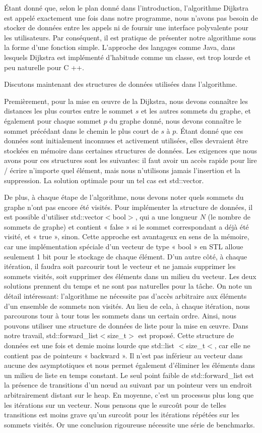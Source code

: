\documentclass[12pt]{article}
\begin{document}
	Étant donné que, selon le plan donné dans l'introduction, l'algorithme Dijkstra est appelé exactement une fois dans notre programme, nous n'avons pas besoin de stocker de données entre les appels ni de fournir une interface polyvalente pour les utilisateurs. Par conséquent, il est pratique de présenter notre algorithme sous la forme d'une fonction simple. L'approche des langages comme Java, dans lesquels Dijkstra est implémenté d’habitude comme un classe, est trop lourde et peu naturelle pour C ++.
	
	Discutons maintenant des structures de données utilisées dans l'algorithme.
	
	Premièrement, pour la mise en œuvre de la Dijkstra, nous devons connaître les distances les plus courtes entre le sommet $s$ et les autres sommets du graphe, et également pour chaque sommet $p$ du graphe donné, nous devons connaître le sommet précédant dans le chemin le plus court de $s$ à $p$. Étant donné que ces données sont initialement inconnues et activement utilisées, elles devraient être stockées en mémoire dans certaines structures de données. Les exigences que nous avons pour ces structures sont les suivantes: il faut avoir un accès rapide pour lire / écrire n'importe quel élément, mais nous n'utilisons jamais l'insertion et la suppression. La solution optimale pour un tel cas est std::vector.
	
	De plus, à chaque étape de l'algorithme, nous devons noter quels sommets du graphe n'ont pas encore été visités. Pour implémenter la structure de données, il est possible d’utiliser std::vector$<$bool$>$, qui a une longueur $N$ (le nombre de sommets de graphe) et contient « false » si le sommet correspondant a déjà été visité, et « true », sinon. Cette approche est avantageux en sens de la mémoire, car une implémentation spéciale d'un vecteur de type « bool » en STL alloue seulement 1 bit pour le stockage de chaque élément. D'un autre côté, à chaque itération, il faudra soit parcourir tout le vecteur et ne jamais supprimer les sommets visités, soit supprimer des éléments dans un milieu du vecteur. Les deux solutions prennent du temps et ne sont pas naturelles pour la tâche. On note un détail intéressant: l'algorithme ne nécessite pas d'accès arbitraire aux éléments d'un ensemble de sommets non visités. Au lieu de cela, à chaque itération, nous parcourons tour à tour tous les sommets dans un certain ordre. Ainsi, nous pouvons utiliser une structure de données de liste pour la mise en œuvre. Dans notre travail, std::forward\_list$<$size\_t$>$ est proposé. Cette structure de données est une fois et demie moins lourde que std::list $<$size\_t$<$, car elle ne contient pas de pointeurs « backward ». Il n'est pas inférieur au vecteur dans aucune des asymptotiques et nous permet également d'éliminer les éléments dans un milieu de liste en temps constant. Le seul point faible de std::forward\_list est la présence de transitions d'un nœud au suivant par un pointeur vers un endroit arbitrairement distant sur le heap. En moyenne, c'est un processus plus long que les itérations sur un vecteur. Nous pensons que le surcoût pour de telles transitions est moins grave qu'un surcoût pour les itérations répétées sur les sommets visités. Or une conclusion rigoureuse nécessite une série de benchmarks.
	
\end{document}
